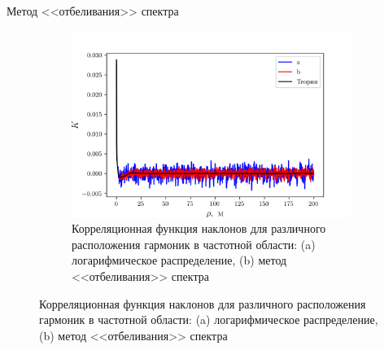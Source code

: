 \documentclass[10pt,pdf,hyperref={unicode}, dvipsnames]{beamer}
\begin{document}
\begin{frame}[t]{Метод <<отбеливания>> спектра}
\begin{figure}[h!]
\begin{subfigure}{0.49\linewidth}
        \includegraphics[width=\linewidth]{fig/water/whitening}
        \caption*{\footnotesize Корреляционная функция наклонов для различного расположения
        гармоник в частотной области: (a) логарифмическое распределение, (b)
    метод <<отбеливания>> спектра}
    \end{subfigure}
\end{figure}
\end{frame}
\end{document}
